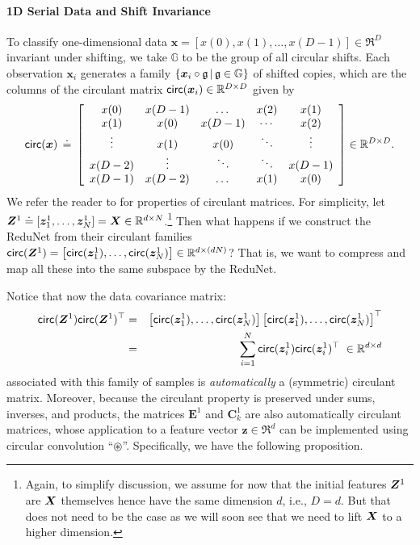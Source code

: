 \documentclass[../../book-main.tex]{subfiles}
\begin{document}
\paragraph{1D Serial Data and  Shift Invariance} To classify one-dimensional data $\bm x = [x(0), x(1), \ldots, x(D-1)] \in \Re^D$ invariant under shifting, we take $\mathbb{G}$ to be the group of all circular shifts. Each observation $\bm x_i$ generates a family $\{ \bm{x}_i \circ \mathfrak{g} \, | \, \mathfrak{g} \in \mathbb G \}$ of shifted copies, which are the columns of the circulant matrix $\mathsf{circ}(\bm x_i) \in \mathbb{R}^{D \times D}$ given by
\begin{equation}
\mathsf{circ}(\bm{x}) \,\doteq\, \left[ \begin{array}{ccccc} x(0) & x(D-1) & \dots & x(2) & x(1) \\ x(1) & x(0) & x(D-1) & \cdots & x(2) \\ \vdots & x(1) & x(0) &\ddots & \vdots \\ x(D-2) &  \vdots & \ddots & \ddots & x(D-1) \\ x(D-1) & x(D-2) & \dots & x(1) & x(0)   \end{array} \right]  \in \mathbb{R}^{D \times D}.
\end{equation}
We refer the reader to \cite{Kra2012OnCM} for properties of circulant matrices. For simplicity, let $\bm Z^1 \doteq [ \bm{z}_{1}^1, \dots, \bm{z}_{N}^1 ] = \bm{X} \in \mathbb{R}^{d \times N}$.\footnote{Again, to simplify discussion, we assume for now that the initial features $\bm{Z}^1$ are $\bm{X}$ themselves hence have the same dimension $d$, i.e., $D=d$. But that does not need to be the case as we will soon see that we need to lift $\bm{X}$ to a higher dimension.} Then what happens if we construct the ReduNet from their circulant families $\mathsf{circ}(\bm Z^1) = \left[ \mathsf{circ}(\bm{z}_{1}^1), \dots, \mathsf{circ}(\bm{z}_{N}^1) \right] \in \mathbb{R}^{d \times (dN)}$? That is, we want to compress and map all these into the same subspace by the ReduNet. 

Notice that now the data covariance matrix: 
\begin{eqnarray}
\mathsf{circ}(\bm Z^1) \mathsf{circ}(\bm Z^1)^\top 
&=& \left[ \mathsf{circ}(\bm{z}_{1}^1), \dots, \mathsf{circ}(\bm{z}_{N}^1) \right] \left[ \mathsf{circ}(\bm{z}_{1}^1), \dots, \mathsf{circ} (\bm{z}_{N}^1) \right]^\top \nonumber \\
&=& \sum_{i =1}^N \mathsf{circ}(\bm{z}_{i}^1) \mathsf{circ}(\bm{z}_{i}^1)^\top \;\in \mathbb{R}^{d\times d} 
\end{eqnarray}
associated with this family of samples is {\em automatically} a (symmetric) circulant matrix. Moreover, because the circulant property is preserved under sums, inverses, and products, the matrices $\bm E^1$ and $\bm C^1_k$ are also automatically circulant matrices, whose application to a feature vector $\bm z \in \Re^d$ can be implemented using circular convolution ``$\circledast$''.
Specifically, we have the following proposition. 
\end{document}
